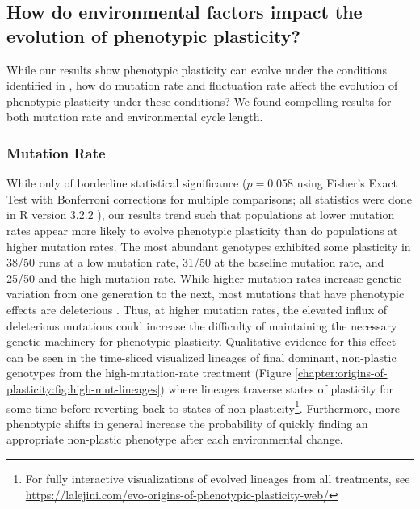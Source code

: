 

\subsection{How do environmental factors impact the evolution of phenotypic plasticity?}

While our results show phenotypic plasticity can evolve under the conditions identified in \citep{ghalambor_behavior_2010}, how do mutation rate and fluctuation rate affect the evolution of phenotypic plasticity under these conditions? 
We found compelling results for both mutation rate and environmental cycle length. 

\subsubsection{Mutation Rate}

While only of borderline statistical significance ($p = 0.058$ using Fisher's Exact Test with Bonferroni corrections for multiple comparisons; all statistics were done in R version 3.2.2 \citep{r_core_team_2016}), our results trend such that populations at lower mutation rates appear more likely to evolve phenotypic plasticity than do populations at higher mutation rates. 
The most abundant genotypes exhibited some plasticity in 38/50 runs at a low mutation rate, 31/50 at the baseline mutation rate, and 25/50 and the high mutation rate.  
While higher mutation rates increase genetic variation from one generation to the next, most mutations that have phenotypic effects are deleterious \citep{sniegowski_evolution_2000}. 
Thus, at higher mutation rates, the elevated influx of deleterious mutations could increase the difficulty of maintaining the necessary genetic machinery for phenotypic plasticity.
Qualitative evidence for this effect can be seen in the time-sliced visualized lineages of final dominant, non-plastic genotypes from the high-mutation-rate treatment (Figure \ref{chapter:origins-of-plasticity:fig:high-mut-lineages}) where lineages traverse states of plasticity for some time before reverting back to states of non-plasticity\footnote{
For fully interactive visualizations of evolved lineages from all treatments, see \url{https://lalejini.com/evo-origins-of-phenotypic-plasticity-web/}
}.
Furthermore, more phenotypic shifts in general increase the probability of quickly finding an appropriate non-plastic phenotype after each environmental change.

